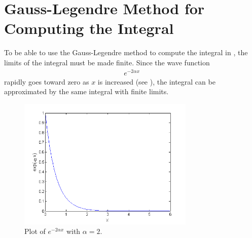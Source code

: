 \section{Gauss-Legendre Method for Computing the Integral}
\label{sec:GaussLegendreMethod}

To be able to use the Gauss-Legendre method to compute the integral in , the limits of the integral must be made  finite.
Since the wave function 
\begin{align}
	e^{-2\alpha x}
\end{align}
rapidly goes toward zero as $x$ is increased (see ), the integral can be approximated  by the same integral with finite limits.

\begin{figure}[H]
	\centering
	\includegraphics[width=0.75\textwidth]{Figures/function_zeropoint.png}
	\caption{Plot of $e^{-2\alpha x}$ with $\alpha = 2$.}
	\label{fig:function_zeropoint}
\end{figure}

